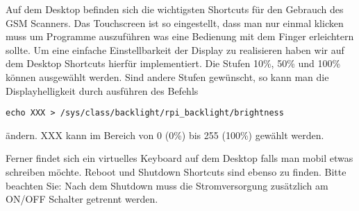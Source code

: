 Auf dem Desktop befinden sich die wichtigsten Shortcuts für den Gebrauch des GSM Scanners. Das Touchscreen ist so eingestellt, dass man nur einmal klicken muss um Programme auszuführen was eine Bedienung mit dem Finger erleichtern sollte. Um eine einfache Einstellbarkeit der Display zu realisieren haben wir auf dem Desktop Shortcuts hierfür implementiert. Die Stufen 10\%, 50\% und 100\% können ausgewählt werden. Sind andere Stufen gewünscht, so kann man die Displayhelligkeit durch ausführen des Befehls
\begin{verbatim}
echo XXX > /sys/class/backlight/rpi_backlight/brightness
\end{verbatim}
ändern. XXX kann im Bereich von 0 (0\%) bis 255 (100\%) gewählt werden. 

Ferner findet sich ein virtuelles Keyboard auf dem Desktop falls man mobil etwas schreiben möchte. Reboot und Shutdown Shortcuts sind ebenso zu finden. Bitte beachten Sie: Nach dem Shutdown muss die Stromversorgung zusätzlich am ON/OFF Schalter getrennt werden.

